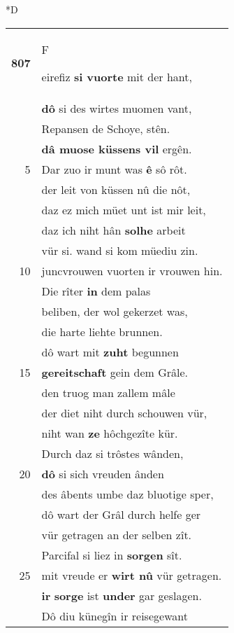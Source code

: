 \documentclass[8pt,a4paper,notitlepage]{article}
\begin{document}
\begin{table}[ht]
\begin{minipage}[t]{0.5\linewidth}
\small
\begin{center}*D
\end{center}
\begin{tabular}{rl}
\textbf{807} & \begin{large}F\end{large}eirefiz \textbf{si vuorte} mit der hant,\\ 
 & \textbf{dô} si des wirtes muomen vant,\\ 
 & Repansen de Schoye, stên.\\ 
 & \textbf{dâ muose küssens vil} ergên.\\ 
5 & Dar zuo ir munt was \textbf{ê} sô rôt.\\ 
 & der leit von küssen nû die nôt,\\ 
 & daz ez mich müet unt ist mir leit,\\ 
 & daz ich niht hân \textbf{solhe} arbeit\\ 
 & vür si. wand si kom müediu zin.\\ 
10 & juncvrouwen vuorten ir vrouwen hin.\\ 
 & Die rîter \textbf{in} dem palas\\ 
 & beliben, der wol gekerzet was,\\ 
 & die harte liehte brunnen.\\ 
 & dô wart mit \textbf{zuht} begunnen\\ 
15 & \textbf{gereitschaft} gein dem Grâle.\\ 
 & den truog man zallem mâle\\ 
 & der diet niht durch schouwen vür,\\ 
 & niht wan \textbf{ze} hôchgezîte kür.\\ 
 & Durch daz si trôstes wânden,\\ 
20 & \textbf{dô} si sich vreuden ânden\\ 
 & des âbents umbe daz bluotige sper,\\ 
 & dô wart der Grâl durch helfe ger\\ 
 & vür getragen an der selben zît.\\ 
 & Parcifal si liez in \textbf{sorgen} sît.\\ 
25 & mit vreude er \textbf{wirt nû} vür getragen.\\ 
 & \textbf{ir} \textbf{sorge} ist \textbf{under} gar geslagen.\\ 
 & Dô diu künegîn ir reisegewant\\ 

\end{tabular}
\end{minipage}
\end{table}
\end{document}
